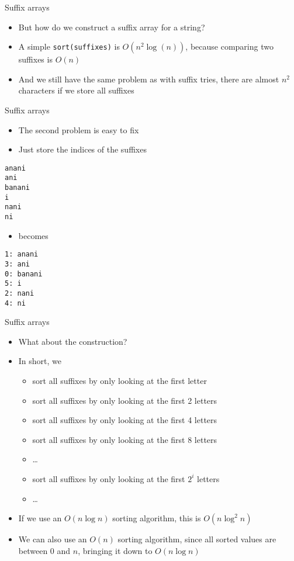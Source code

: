 \documentclass[12pt,t]{beamer}
\newcommand{\bi}{\begin{itemize}}
\newcommand{\ei}{\end{itemize}}
\begin{document}
\begin{frame}{Suffix arrays}
    \vspace{30pt}
    \bi
        \item But how do we construct a suffix array for a string?
            \vspace{10pt}
        \item A simple \texttt{sort(suffixes)} is $O(n^2\log(n))$, because comparing two suffixes is $O(n)$
        \item And we still have the same problem as with suffix tries, there are almost $n^2$ characters if we store all suffixes
    \ei
\end{frame}

\begin{frame}[fragile]{Suffix arrays}
    \bi
        \item The second problem is easy to fix
        \item Just store the indices of the suffixes
    \ei
    \begin{verbatim}
anani
ani
banani
i
nani
ni
    \end{verbatim}
    \bi
        \item becomes
    \ei
    \begin{verbatim}
1: anani
3: ani
0: banani
5: i
2: nani
4: ni
    \end{verbatim}
\end{frame}

\begin{frame}{Suffix arrays}
    \bi
        \item What about the construction?
        \item In short, we
            \bi
                \item sort all suffixes by only looking at the first letter
                \item sort all suffixes by only looking at the first 2 letters
                \item sort all suffixes by only looking at the first 4 letters
                \item sort all suffixes by only looking at the first 8 letters
                \item \ldots
                \item sort all suffixes by only looking at the first $2^i$ letters
                \item \ldots
            \ei
        \vspace{10pt}
    \item If we use an $O(n\log n)$ sorting algorithm, this is $O(n\log^2 n)$
    \item We can also use an $O(n)$ sorting algorithm, since all sorted values are between $0$ and $n$, bringing it down to $O(n \log n)$
    \ei
\end{frame}
\end{document}
